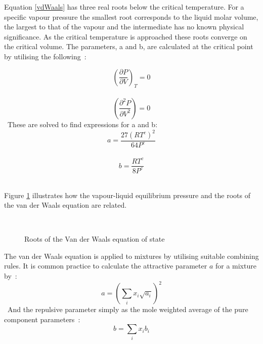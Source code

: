 Equation \ref{vdWaals} has three real roots below the critical temperature. For a specific vapour pressure the smallest root corresponds to the liquid molar volume, the largest to that of the vapour and the intermediate has no known physical significance. As the critical temperature is approached these roots converge on the critical volume. The parameters, a and b, are calculated at the critical point by utilising the following~\cite{ThermophysicalProperties}:\

\begin{equation}
\left( \dfrac{\partial P}{\partial V}\right) _{T}=0 
\end{equation}\
\begin{equation}
\left( \dfrac{\partial^{2}P}{\partial V^{2}}\right) =0
\end{equation}\
These are solved to find expressions for a and b:\
\begin{equation}
a = \dfrac{27 \left( RT^{c} \right) ^{2}}{64P^{c}} \label{Consta}
\end{equation}\
\begin{equation}
b = \dfrac{ RT^{c}}{8P^{c}} \label{Constb}
\end{equation}\


Figure \ref{roots} illustrates how the vapour-liquid equilibrium pressure and the roots of the van der Waals equation are related.\\
				
\begin{figure}[t]
\begin{center}
\resizebox{0.7\textwidth}{!}{}\\
\end{center}
\caption{Roots of the Van der Waals equation of state} \label{roots}
\end{figure}

The van der Waals equation is applied to mixtures by utilising suitable combining rules. It is common practice to calculate the attractive parameter $a$ for a mixture by~\cite{ThermophysicalProperties}:\
\begin{equation}
a = \left(\sum_{i} x_{i} \sqrt{a_{i}}\right)^{2}
\end{equation}\
And the repulsive parameter simply as the mole weighted average of the pure component parameters~\cite{ThermophysicalProperties}:\
\begin{equation}
b = \sum_{i} x_{i}b_{i}
\end{equation}\

